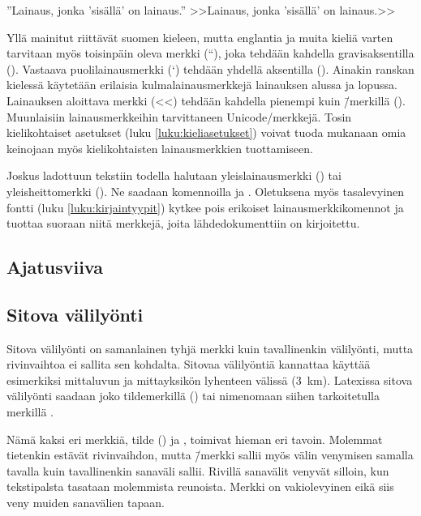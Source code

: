 \begin{koodilohkosis}
  ''Lainaus, jonka 'sisällä' on lainaus.''
  >>Lainaus, jonka 'sisällä' on lainaus.>>
\end{koodilohkosis}

Yllä mainitut riittävät suomen kieleen, mutta englantia ja muita kieliä
varten tarvitaan myös toisinpäin oleva merkki (``), joka tehdään
kahdella gra\-vis\-ak\-sen\-til\-la (). Vastaava
puolilainausmerkki (`) tehdään yhdellä aksentilla (). Ainakin
ranskan kielessä käytetään erilaisia kulmalainausmerkkejä lainauksen
alussa ja lopussa. Lainauksen aloittava merkki (<<) tehdään kahdella
pienempi kuin \=/merkillä (\koodi{<<}). Muunlaisiin lainausmerkkeihin
tarvittaneen Unicode\-/merkkejä. Tosin kielikohtaiset asetukset (luku
\ref{luku:kieliasetukset}) voivat tuoda mukanaan omia keinojaan myös
kielikohtaisten lainausmerkkien tuottamiseen.

Joskus ladottuun tekstiin todella halutaan yleislainausmerkki
(\textquotedbl) tai yleisheittomerkki (\textquotesingle). Ne saadaan
komennoilla  ja .
Oletuksena myös tasalevyinen fontti (luku \ref{luku:kirjaintyypit})
kytkee pois erikoiset lainausmerkkikomennot ja tuottaa suoraan niitä
merkkejä, joita lähdedokumenttiin on kirjoitettu.

\subsection{Ajatusviiva}
\subsection{Sitova välilyönti}

Sitova välilyönti on samanlainen tyhjä merkki kuin tavallinenkin
välilyönti, mutta rivinvaihtoa ei sallita sen kohdalta. Sitovaa
välilyöntiä kannattaa käyttää esimerkiksi mittaluvun ja mittayksikön
lyhenteen välissä (3~km). Latexissa sitova välilyönti saadaan joko
tildemerkillä (\koodi{\textasciitilde}) tai nimenomaan siihen
tarkoitetulla merkillä .

Nämä kaksi eri merkkiä, tilde (\koodi{\textasciitilde}) ja
, toimivat hieman eri tavoin. Molemmat tietenkin estävät
rivinvaihdon, mutta \koodi{\textasciitilde}\=/merkki sallii myös välin
venymisen samalla tavalla kuin tavallinenkin sanaväli sallii. Rivillä
sanavälit venyvät silloin, kun tekstipalsta tasataan molemmista
reunoista. Merkki  on vakiolevyinen eikä siis veny
muiden sanavälien tapaan.

